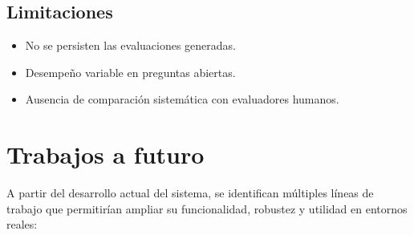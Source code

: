 \documentclass[12pt]{article}
\begin{document}
\subsection*{Limitaciones}
\begin{itemize}
  \item No se persisten las evaluaciones generadas.
  \item Desempeño variable en preguntas abiertas.
  \item Ausencia de comparación sistemática con evaluadores humanos.
\end{itemize}

\section{Trabajos a futuro}

A partir del desarrollo actual del sistema, se identifican múltiples líneas de trabajo que permitirían ampliar su funcionalidad, robustez y utilidad en entornos reales:
\end{document}
